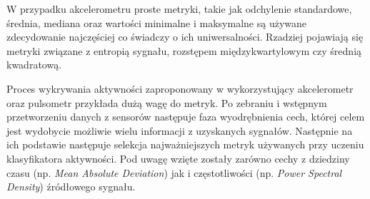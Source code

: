 W przypadku akcelerometru proste metryki, takie jak odchylenie standardowe, średnia, mediana oraz wartości minimalne i maksymalne są używane zdecydowanie najczęściej co świadczy o ich uniwersalności. Rzadziej pojawiają się metryki związane z entropią sygnału, rozstępem międzykwartylowym czy średnią kwadratową.

Proces wykrywania aktywności zaproponowany w \cite{S04} wykorzystujący akcelerometr oraz pulsometr przykłada dużą wagę do metryk. Po zebraniu i wstępnym przetworzeniu danych z sensorów następuje faza wyodrębnienia cech, której celem jest wydobycie możliwie wielu informacji z uzyskanych sygnałów. Następnie na ich podstawie następuje selekcja najważniejszych metryk używanych przy uczeniu klasyfikatora aktywności. Pod uwagę wzięte zostały zarówno cechy z dziedziny czasu (np. {\it Mean Absolute Deviation}) jak i częstotliwości (np. {\it Power Spectral Density}) źródłowego sygnału.

